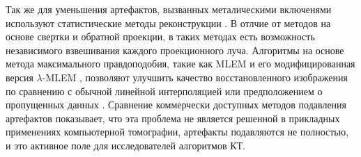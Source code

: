 Так же для уменьшения артефактов, вызванных металическими включенями используют статистические методы реконструкции \cite{jmuller2006, buzug2008computed}.
В отлчие от методов на основе свертки и обратной проекции, в таких методах есть возможность независимого взвешивания каждого проекционного луча.
Алгоритмы на основе метода максимального правдоподобия, такие как MLEM \cite{buzug2008computed, wang1996iterative} и его модифицированная версия $\lambda$-MLEM \cite{oehler2007statistical}, позволяют улучшить качество восстановленного изображения по сравнению с обычной линейной интерполяцией или предположением о пропущенных данных \cite{amirkhanov2012evaluation}.
Сравнение коммерчески доступных методов подавления артефактов \cite{huang2015evaluation} показывает, что эта проблема не является решенной в прикладных применениях компьютерной томографии, артефакты подавляются не полностью, и это активное поле для исследователей алгоритмов КТ.

\begin{comment}

\todo{введение - обзор из статьи аит2013 и бакалаврского диплома}

 Предлагаются новые версии алгоритмов, основанных на алгебраическом подходе, способных работать с сильно зашумлёнными проекциями. Такое условие сформировано необходимостью сокращать время регистрации проекций. Для некоторых применений уменьшение времени регистрации связано с требованием сокращения дозы облучения, для других --- обусловлено высокой динамикой поведения исследуемого объекта. Также следует отметить, что алгебраические методы реконструкции незаменимы, когда речь идет об экспериментах с малым числом проекционных углов и измерениях в ограниченном телесном угле. Только алгебраические методы применимы для решения задач трансмиссионно-эмиссионной томографии, если ослаблением зондирующего и вторичного излучений пренебречь нельзя.




\end{comment}

